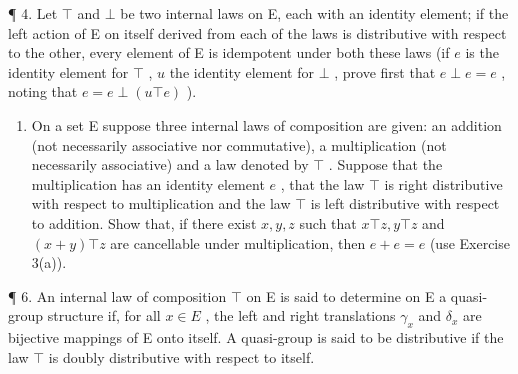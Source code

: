¶ 4. Let \(\top\) and \(\bot\) be two internal laws on E, each with an identity element; if the left action of E on itself derived from each of the laws is distributive with respect to the other, every element of E is idempotent under both these laws (if \(e\) is the identity element for \(\top\) , \(u\) the identity element for \(\bot\) , prove first that \(e \perp e = e\) , noting that \(e = e \perp (u \top e)\) ).

\begin{enumerate}
\def\labelenumi{\arabic{enumi}.}
\setcounter{enumi}{4}
\tightlist
\item
  On a set E suppose three internal laws of composition are given: an addition (not necessarily associative nor commutative), a multiplication (not necessarily associative) and a law denoted by \(\top\) . Suppose that the multiplication has an identity element \(e\) , that the law \(\top\) is right distributive with respect to multiplication and the law \(\top\) is left distributive with respect to addition. Show that, if there exist \(x, y, z\) such that \(x \top z, y \top z\) and \((x + y) \top z\) are cancellable under multiplication, then \(e + e = e\) (use Exercise 3(a)).
\end{enumerate}

¶ 6. An internal law of composition \(\top\) on E is said to determine on E a quasi-group structure if, for all \(x \in E\) , the left and right translations \(\gamma_x\) and \(\delta_x\) are bijective mappings of E onto itself. A quasi-group is said to be distributive if the law \(\top\) is doubly distributive with respect to itself.

